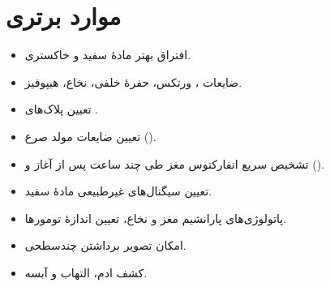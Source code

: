 \documentclass[a4paper,12pt]{extbook}
\begin{document}
\section*{موارد برتری }
\begin{itemize}
\item افتراق بهتر مادهٔ سفید و خاکستری.
\item ضایعات ، ورتکس، حفرهٔ خلفی، نخاع، هیپوفیز.
\item تعیین پلاک‌های .
\item تعیین ضایعات مولد صرع ().
\item تشخیص سریع انفارکتوس مغز طی چند ساعت پس از آغاز و  ().
\item تعیین سیگنال‌های غیرطبیعی مادهٔ سفید.
\item پاتولوژی‌های پارانشیم مغز و نخاع، تعیین اندازهٔ تومورها.
\item امکان تصویر برداشتن چندسطحی.
\item کشف ادم، التهاب  و آبسه.
\end{itemize}

\endgroup
\ifParaclinicStandalone
  \expandafter\enddocument
\fi
\end{document}
